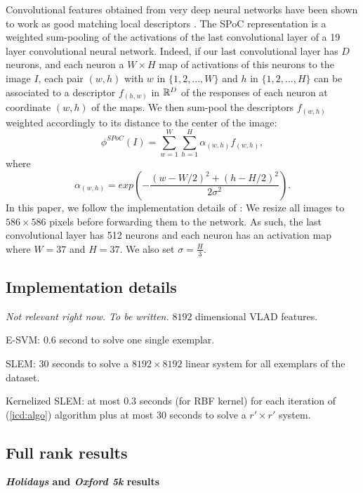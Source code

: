 Convolutional features obtained from very deep neural networks have been shown to work as good matching local descriptors \cite{SimonZisser15}. 
The SPoC representation \cite{babenko15} is a weighted sum-pooling of the activations of the last convolutional layer of a 19 layer convolutional neural network. 
Indeed, if our last convolutional layer has $D$ neurons, and each neuron a $W\times H$ map of activations of this neurons to the image $I$, 
each pair $(w,h)$ with $w$ in $\{1,2,..., W\}$ and $h$ in $\{1,2,...,H\}$ can be associated to a descriptor $f_{(h,w)}$ in $\mathbb R^D$ of the responses of each neuron at coordinate $(w,h)$ of the maps. 
We then sum-pool the descriptors $f_{(w,h)}$ weighted accordingly to its distance to the center of the image:
\begin{equation}
    \phi^{SPoC}(I) = \sum_{w=1}^W\sum_{h=1}^H \alpha_{(w,h)}f_{(w,h)},
\end{equation}
where
\begin{equation}
    \alpha_{(w,h)} = exp \left(-\dfrac{(w-W/2)^2+(h-H/2)^2}{2\sigma^2}\right).
\end{equation}
In this paper, we follow the implementation details of \cite{babenko15}: We resize all images to $586\times 586$ pixels before forwarding them to the network. As such, the last convolutional layer has 512 neurons and each neuron has an activation map where $W=37$ and $H=37$. We also set $\sigma=\frac{H}{3}$.

\subsection{Implementation details}
\emph{\color{red} Not relevant right now.  To be written.}
$8192$ dimensional VLAD features.

E-SVM: $0.6$ second to solve one single exemplar.

SLEM: $30$ seconds to solve a $8192\times 8192$ linear system for all exemplars of the dataset.

Kernelized SLEM: at most $0.3$ seconds (for RBF kernel) for each iteration of (\ref{icd:algo}) algorithm plus at most $30$ seconds to solve a $r'\times r'$ system.


\subsection{Full rank results}

\textbf{\emph{Holidays} and \emph{Oxford 5k} results}

